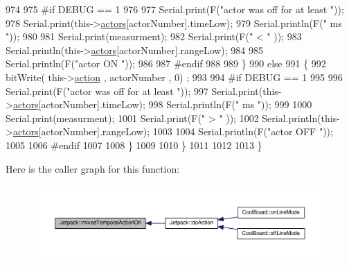\begin{DoxyCode}
974 
975 \textcolor{preprocessor}{        #if DEBUG == 1 }
976 
977             Serial.print(F(\textcolor{stringliteral}{"actor was off for at least "}));
978             Serial.print(this->\hyperlink{class_jetpack_a7e16d2f97837f9712a2e6de1c50d99db}{actors}[actorNumber].timeLow);
979             Serial.println(F(\textcolor{stringliteral}{" ms "}));
980 
981             Serial.print(measurment);
982             Serial.print(F(\textcolor{stringliteral}{" < "} ));
983             Serial.println(this->\hyperlink{class_jetpack_a7e16d2f97837f9712a2e6de1c50d99db}{actors}[actorNumber].rangeLow);
984     
985             Serial.println(F(\textcolor{stringliteral}{"actor ON "}));
986     
987 \textcolor{preprocessor}{        #endif  }
988 
989         \}
990         \textcolor{keywordflow}{else} 
991         \{
992             bitWrite( this->\hyperlink{class_jetpack_aca3142925a7b0834b34ae91d26af7765}{action} , actorNumber , 0) ;   
993 
994 \textcolor{preprocessor}{        #if DEBUG == 1 }
995 
996             Serial.print(F(\textcolor{stringliteral}{"actor was off for at least "}));
997             Serial.print(this->\hyperlink{class_jetpack_a7e16d2f97837f9712a2e6de1c50d99db}{actors}[actorNumber].timeLow);
998             Serial.println(F(\textcolor{stringliteral}{" ms "}));
999 
1000             Serial.print(measurment);
1001             Serial.print(F(\textcolor{stringliteral}{" > "} ));
1002             Serial.println(this->\hyperlink{class_jetpack_a7e16d2f97837f9712a2e6de1c50d99db}{actors}[actorNumber].rangeLow);
1003 
1004             Serial.println(F(\textcolor{stringliteral}{"actor OFF "}));
1005     
1006 \textcolor{preprocessor}{        #endif              }
1007 
1008         \}
1009 
1010     \}
1011 
1012     
1013 \}
\end{DoxyCode}
Here is the caller graph for this function\+:\nopagebreak
\begin{figure}[H]
\begin{center}
\leavevmode
\includegraphics[width=350pt]{df/d1d/class_jetpack_af44bc8a08818e4433dfb1c7104601f12_icgraph}
\end{center}
\end{figure}
\mbox{\label{class_jetpack_a65ce9533c39fa71e4945b970bf14b980}} 
